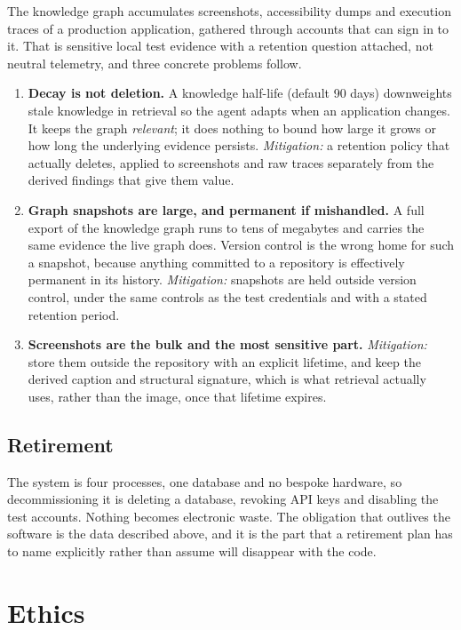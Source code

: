 The knowledge graph accumulates screenshots, accessibility dumps and execution
traces of a production application, gathered through accounts that can sign in
to it. That is sensitive local test evidence with a retention question
attached, not neutral telemetry, and three concrete problems follow.

\begin{enumerate}[label=\textbf{E\arabic*.},leftmargin=3.0em]
  \item \textbf{Decay is not deletion.} A knowledge half-life (default 90 days)
    downweights stale knowledge in retrieval so the agent adapts when an
    application changes. It keeps the graph \emph{relevant}; it does nothing to
    bound how large it grows or how long the underlying evidence persists.
    \emph{Mitigation:} a retention policy that actually deletes, applied to
    screenshots and raw traces separately from the derived findings that give
    them value.
  \item \textbf{Graph snapshots are large, and permanent if mishandled.} A full export of the knowledge graph runs to tens of megabytes and carries the same evidence the live graph does. Version control is the wrong home for such a snapshot, because anything committed to a repository is effectively permanent in its history. \emph{Mitigation:} snapshots are held outside version control, under the same controls as the test credentials and with a stated retention period.
  \item \textbf{Screenshots are the bulk and the most sensitive part.}
    \emph{Mitigation:} store them outside the repository with an explicit
    lifetime, and keep the derived caption and structural signature, which is
    what retrieval actually uses, rather than the image, once that lifetime
    expires.
\end{enumerate}

\subsection*{Retirement}

The system is four processes, one database and no bespoke hardware, so
decommissioning it is deleting a database, revoking API keys and disabling the
test accounts. Nothing becomes electronic waste. The obligation that outlives
the software is the data described above, and it is the part that a retirement
plan has to name explicitly rather than assume will disappear with the code.

\section{Ethics}
\label{sec:ethics}

